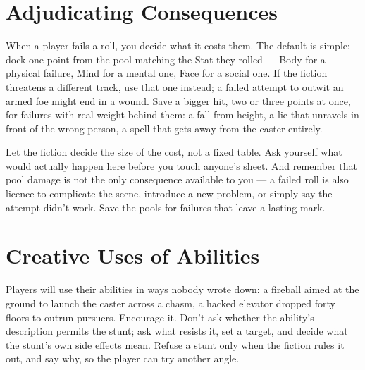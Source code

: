 \section{Adjudicating Consequences}
When a player fails a roll, you decide what it costs them. The default
is simple: dock one point from the pool matching the Stat they rolled
--- Body for a physical failure, Mind for a mental one, Face for a
social one. If the fiction threatens a different track, use that one
instead; a failed attempt to outwit an armed foe might end in a wound.
Save a bigger hit, two or three points at once, for failures with real
weight behind them: a fall from height, a lie that unravels in front
of the wrong person, a spell that gets away from the caster entirely.

Let the fiction decide the size of the cost, not a fixed table. Ask
yourself what would actually happen here before you touch anyone's
sheet. And remember that pool damage is not the only consequence
available to you --- a failed roll is also licence to complicate the
scene, introduce a new problem, or simply say the attempt didn't work.
Save the pools for failures that leave a lasting mark.

\section{Creative Uses of Abilities}
Players will use their abilities in ways nobody wrote down: a fireball
aimed at the ground to launch the caster across a chasm, a hacked
elevator dropped forty floors to outrun pursuers. Encourage it. Don't ask
whether the ability's description permits the stunt; ask what resists
it, set a target, and decide what the stunt's own side effects mean.
Refuse a stunt only when the fiction rules it out, and say why, so the
player can try another angle.

